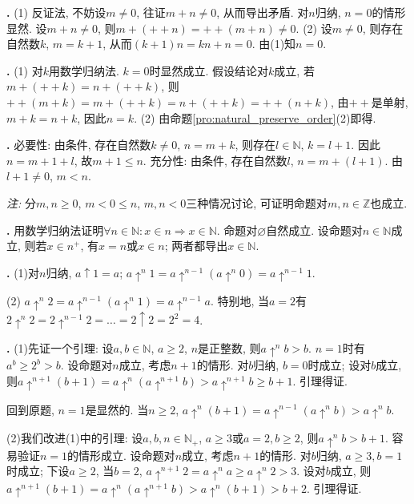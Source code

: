 \par \textbf{\thesolset .} (1) \cite{AnT1} 反证法, 不妨设$m\neq 0$, 往证$m+n\neq 0$, 从而导出矛盾. 对$n$归纳, $n=0$的情形显然. 设$m+n\neq 0$, 则$m+(++n)=++(m+n)\neq 0$. (2) 设$m\neq 0$, 则存在自然数$k$, $m=k+1$, 从而$(k+1)n=kn+n=0$. 由(1)知$n=0$. 

\par \textbf{\thesolset .} (1) 对$k$用数学归纳法. $k=0$时显然成立. 假设结论对$k$成立, 若$m+(++k)=n+(++k)$, 则$++(m+k)=m+(++k)=n+(++k)=++(n+k)$, 由$++$是单射, $m+k=n+k$, 因此$n=k$. (2) 由命题\ref{pro:natural_preserve_order}(2)即得. 

\par \textbf{\thesolset .} 必要性: 由条件, 存在自然数$k\neq 0$, $n=m+k$, 则存在$l\in \mathbb{N}$, $k=l+1$. 因此$n=m+1+l$, 故$m+1\le n$. 充分性: 由条件, 存在自然数$l$, $n=m+(l+1)$. 由$l+1\neq 0$, $m<n$. 
\par \emph{注:} 分$m,n\ge 0$, $m<0\le n$, $m,n<0$三种情况讨论, 可证明命题对$m,n\in \mathbb{Z}$也成立. 

\par \textbf{\thesolset .} 用数学归纳法证明$\forall n\in \mathbb{N}: x\in n\Rightarrow x\in \mathbb{N}$. 命题对$\varnothing$自然成立. 设命题对$n\in \mathbb{N}$成立, 则若$x\in n^+$, 有$x=n$或$x\in n$; 两者都导出$x\in \mathbb{N}$. 

\par \textbf{\thesolset .} (1)对$n$归纳, $a\uparrow 1=a$; $a\uparrow^n 1=a\uparrow^{n-1}(a\uparrow^n 0)=a\uparrow^{n-1} 1$. 
\par (2) $a\uparrow^n 2=a\uparrow^{n-1}(a\uparrow^n 1)=a\uparrow^{n-1}a$. 特别地, 当$a=2$有$2\uparrow^n 2=2\uparrow^{n-1}2=\dots=2\uparrow 2=2^2=4$.

\par \textbf{\thesolset .} (1)先证一个引理: 设$a,b\in \mathbb{N}$, $a\ge 2$, $n$是正整数, 则$a\uparrow^n b>b$. $n=1$时有$a^b\ge 2^b>b$. 设命题对$n$成立, 考虑$n+1$的情形. 对$b$归纳, $b=0$时成立; 设对$b$成立, 则$a\uparrow^{n+1}(b+1)=a\uparrow^n(a\uparrow^{n+1}b)> a\uparrow^{n+1}b \ge b+1$. 引理得证. 
\par 回到原题, $n=1$是显然的. 当$n\ge 2$, $a\uparrow^n (b+1)=a\uparrow^{n-1}(a\uparrow^nb)>a\uparrow^n b$.
\par (2)我们改进(1)中的引理: 设$a,b,n\in \mathbb{N}_+$, $a\ge 3$或$a=2, b\ge 2$, 则$a\uparrow^n b>b+1$. 容易验证$n=1$的情形成立. 设命题对$n$成立, 考虑$n+1$的情形. 对$b$归纳, $a\ge 3, b=1$时成立; 下设$a\ge 2$, 当$b=2$, $a\uparrow^{n+1}2=a\uparrow^n a\ge a\uparrow^n 2>3$. 
设对$b$成立, 则$a\uparrow^{n+1}(b+1)=a\uparrow^n(a\uparrow^{n+1}b)> a\uparrow^n (b+1) > b+2$. 引理得证. 

